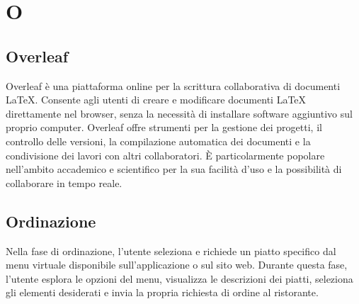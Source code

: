 \section{O}
\subsection{Overleaf}
Overleaf è una piattaforma online per la scrittura collaborativa di documenti
LaTeX. Consente agli utenti di creare e modificare documenti LaTeX direttamente
nel browser, senza la necessità di installare software aggiuntivo sul proprio
computer. Overleaf offre strumenti per la gestione dei progetti, il controllo
delle versioni, la compilazione automatica dei documenti e la condivisione dei
lavori con altri collaboratori. È particolarmente popolare nell'ambito
accademico e scientifico per la sua facilità d'uso e la possibilità di
collaborare in tempo reale.
\subsection{Ordinazione}
Nella fase di ordinazione, l'utente seleziona e richiede un piatto specifico
dal menu virtuale disponibile sull'applicazione o sul sito web. Durante questa
fase, l'utente esplora le opzioni del menu, visualizza le descrizioni dei
piatti, seleziona gli elementi desiderati e invia la propria richiesta di
ordine al ristorante.
